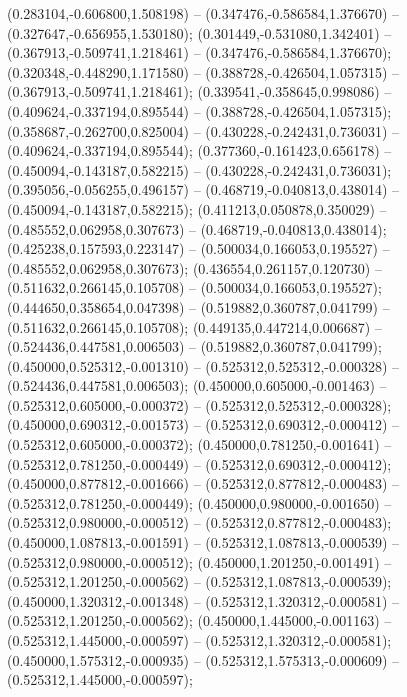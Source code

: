  (0.283104,-0.606800,1.508198) -- (0.347476,-0.586584,1.376670) -- (0.327647,-0.656955,1.530180);
 (0.301449,-0.531080,1.342401) -- (0.367913,-0.509741,1.218461) -- (0.347476,-0.586584,1.376670);
 (0.320348,-0.448290,1.171580) -- (0.388728,-0.426504,1.057315) -- (0.367913,-0.509741,1.218461);
 (0.339541,-0.358645,0.998086) -- (0.409624,-0.337194,0.895544) -- (0.388728,-0.426504,1.057315);
 (0.358687,-0.262700,0.825004) -- (0.430228,-0.242431,0.736031) -- (0.409624,-0.337194,0.895544);
 (0.377360,-0.161423,0.656178) -- (0.450094,-0.143187,0.582215) -- (0.430228,-0.242431,0.736031);
 (0.395056,-0.056255,0.496157) -- (0.468719,-0.040813,0.438014) -- (0.450094,-0.143187,0.582215);
 (0.411213,0.050878,0.350029) -- (0.485552,0.062958,0.307673) -- (0.468719,-0.040813,0.438014);
 (0.425238,0.157593,0.223147) -- (0.500034,0.166053,0.195527) -- (0.485552,0.062958,0.307673);
 (0.436554,0.261157,0.120730) -- (0.511632,0.266145,0.105708) -- (0.500034,0.166053,0.195527);
 (0.444650,0.358654,0.047398) -- (0.519882,0.360787,0.041799) -- (0.511632,0.266145,0.105708);
 (0.449135,0.447214,0.006687) -- (0.524436,0.447581,0.006503) -- (0.519882,0.360787,0.041799);
 (0.450000,0.525312,-0.001310) -- (0.525312,0.525312,-0.000328) -- (0.524436,0.447581,0.006503);
 (0.450000,0.605000,-0.001463) -- (0.525312,0.605000,-0.000372) -- (0.525312,0.525312,-0.000328);
 (0.450000,0.690312,-0.001573) -- (0.525312,0.690312,-0.000412) -- (0.525312,0.605000,-0.000372);
 (0.450000,0.781250,-0.001641) -- (0.525312,0.781250,-0.000449) -- (0.525312,0.690312,-0.000412);
 (0.450000,0.877812,-0.001666) -- (0.525312,0.877812,-0.000483) -- (0.525312,0.781250,-0.000449);
 (0.450000,0.980000,-0.001650) -- (0.525312,0.980000,-0.000512) -- (0.525312,0.877812,-0.000483);
 (0.450000,1.087813,-0.001591) -- (0.525312,1.087813,-0.000539) -- (0.525312,0.980000,-0.000512);
 (0.450000,1.201250,-0.001491) -- (0.525312,1.201250,-0.000562) -- (0.525312,1.087813,-0.000539);
 (0.450000,1.320312,-0.001348) -- (0.525312,1.320312,-0.000581) -- (0.525312,1.201250,-0.000562);
 (0.450000,1.445000,-0.001163) -- (0.525312,1.445000,-0.000597) -- (0.525312,1.320312,-0.000581);
 (0.450000,1.575312,-0.000935) -- (0.525312,1.575313,-0.000609) -- (0.525312,1.445000,-0.000597);
